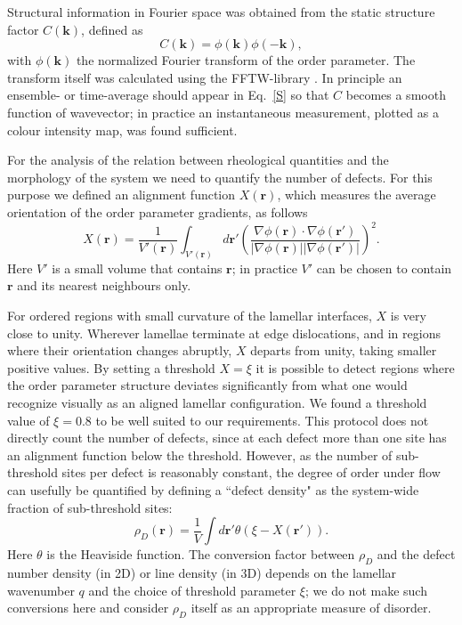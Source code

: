 \documentclass[8.5pt,twoside,twocolumn]{article}
\begin{document}
Structural information in Fourier space was obtained from the static structure factor $C({\mathbf k})$, defined as
%
\begin{equation}
C({\mathbf k})=\phi({\mathbf k})\phi(-{\mathbf k}),
\label{S}\end{equation}
%
with $\phi({\mathbf k})$ the normalized Fourier transform of the order parameter.
The transform itself was calculated using the FFTW-library \cite{FFTW}.
In principle an ensemble- or time-average should appear in Eq.~\ref{S} so that $C$ becomes a smooth function of wavevector; in practice an instantaneous measurement, plotted as a colour intensity map, was found sufficient.

For the analysis of the relation between rheological quantities and the morphology of the system we need to quantify the number of defects.
For this purpose we defined an alignment function $X({\mathbf r})$, which measures the average orientation of the order parameter gradients, as follows
%
\begin{equation}\label{alignment}
X({\mathbf r})=\frac{1}{V'({\mathbf r})} \int_{V'({\mathbf r})} d{\mathbf r'} \left(\frac{\nabla \phi ({\mathbf r}) \cdot \nabla \phi ({\mathbf r'})}{|\nabla\phi ({\mathbf r}) ||\nabla\phi ({\mathbf r'}) |}\right)^2. 
\end{equation}
%
Here $V'$ is a small volume that contains $\mathbf r$; in practice $V'$ can be chosen to contain $\mathbf r$ and its nearest neighbours only.

For ordered regions with small curvature of the lamellar interfaces, $X$ is very close to unity. Wherever lamellae terminate at edge dislocations, and in regions where their orientation changes abruptly, $X$ departs from unity, taking smaller positive values.
By setting a threshold $X=\xi$ it is possible to detect regions where the order parameter structure deviates significantly from what one would recognize visually as an aligned lamellar configuration.
We found a threshold value of $\xi=0.8$ to be well suited to our requirements. This protocol does not directly count the number of defects, since at each defect more than one site has an alignment function below the threshold.
However, as the number of sub-threshold sites per defect is reasonably constant, the degree of order under flow can usefully be quantified by defining a ``defect density" as the system-wide fraction of sub-threshold sites:
%
\begin{equation}\label{defect density}
\rho_D({\mathbf r})=\frac{1}{V} \int d{\mathbf r'} \theta(\xi-X(\mathbf r')).  
\end{equation}
%
Here $\theta$ is the Heaviside function. The conversion factor between $\rho_D$ and the defect number density (in 2D) or line density (in 3D) depends on the lamellar wavenumber $q$ and the choice of threshold parameter $\xi$; we do not make such conversions here and consider $\rho_D$ itself as an appropriate measure of disorder.
\end{document}
